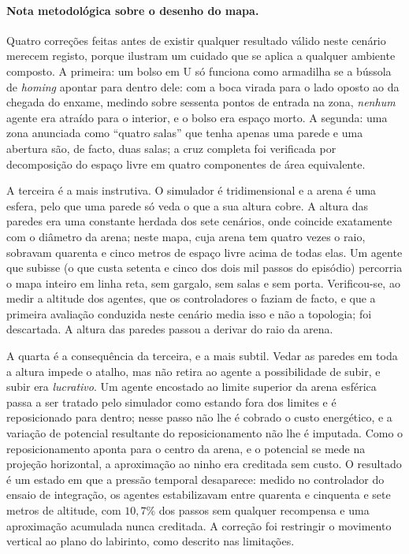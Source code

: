 \paragraph{Nota metodológica sobre o desenho do mapa.} Quatro correções feitas
antes de existir qualquer resultado válido neste cenário merecem registo, porque
ilustram um cuidado que se aplica a qualquer ambiente composto.
A primeira: um bolso em U só funciona como armadilha se a bússola de
\textit{homing} apontar para dentro dele: com a boca virada para o lado
oposto ao da chegada do enxame, medindo sobre sessenta pontos de entrada na zona,
\emph{nenhum} agente era atraído para o interior, e o bolso era espaço morto.
A segunda: uma zona anunciada como ``quatro salas'' que tenha apenas uma parede e
uma abertura são, de facto, duas salas; a cruz completa foi verificada por
decomposição do espaço livre em quatro componentes de área equivalente.

A terceira é a mais instrutiva. O simulador é tridimensional e a arena é uma
esfera, pelo que uma parede só veda o que a sua altura cobre. A altura das
paredes era uma constante herdada dos sete cenários, onde coincide exatamente com
o diâmetro da arena; neste mapa, cuja arena tem quatro vezes o raio, sobravam
quarenta e cinco metros de espaço livre acima de todas elas. Um agente que subisse
(o que custa setenta e cinco dos dois mil passos do episódio) percorria o
mapa inteiro em linha reta, sem gargalo, sem salas e sem porta. Verificou-se, ao
medir a altitude dos agentes, que os controladores o faziam de facto, e que a
primeira avaliação conduzida neste cenário media isso e não a topologia; foi
descartada. A altura das paredes passou a derivar do raio da arena.

A quarta é a consequência da terceira, e a mais subtil. Vedar as paredes em toda
a altura impede o atalho, mas não retira ao agente a possibilidade de subir, e
subir era \emph{lucrativo}. Um agente encostado ao limite superior da arena
esférica passa a ser tratado pelo simulador como estando fora dos limites e é
reposicionado para dentro; nesse passo não lhe é cobrado o custo energético, e a
variação de potencial resultante do reposicionamento não lhe é imputada. Como o
reposicionamento aponta para o centro da arena, e o potencial se mede na projeção
horizontal, a aproximação ao ninho era creditada sem custo. O resultado é um
estado em que a pressão temporal desaparece: medido no controlador do ensaio de
integração, os agentes estabilizavam entre quarenta e cinquenta e sete metros de
altitude, com $10{,}7\%$ dos passos sem qualquer recompensa e uma aproximação
acumulada nunca creditada. A correção foi restringir o movimento vertical ao plano
do labirinto, como descrito nas limitações.

